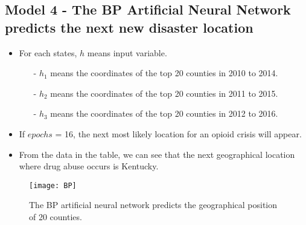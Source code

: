 \documentclass{mcmthesis}
\begin{document}
\subsection{Model 4 - The BP Artificial Neural Network predicts the next new disaster location} %
\begin{itemize}
	 \item  For each states, $h$ means input variable.
\begin{itemize}
	\item[-] $h_1$ means the coordinates of the top 20 counties in 2010 to 2014.\\%
	\item[-] $h_2$ means the coordinates of the top 20 counties in 2011 to 2015. \\
	\item[-] $h_3$ means the coordinates of the top 20 counties in 2012 to 2016. \\
\end{itemize}
\end{itemize}
\begin{itemize}
	\item  If $ epochs$ = 16, the next most likely location for an opioid crisis will appear.%
	\item From the data in the table, we can see that the next geographical location where drug abuse occurs is Kentucky.%
\end{itemize}
\begin{figure}[!h] %
	\small
	\centering
	\texttt{[image: BP]}
	\caption{The BP artificial neural network predicts the geographical position of 20 counties.} %
	\label{fig:BP}
\end{figure}
\end{document}
